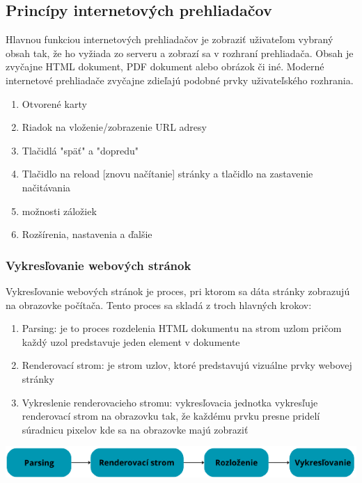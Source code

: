 \documentclass[10pt,Slovak,a4paper]{article}
\begin{document}
    
    \subsection{Princípy internetových prehliadačov}
    \begin{paragraph}
        Hlavnou funkciou internetových prehliadačov je zobraziť uživateľom vybraný obsah tak, že ho vyžiada zo serveru a zobrazí sa v rozhraní prehliadača. Obsah je zvyčajne HTML dokument, PDF dokument alebo obrázok či iné. Moderné internetové prehliadače zvyčajne zdieľajú podobné prvky uživateľského rozhrania. 
        
        \begin{enumerate}
          \item Otvorené karty
          \item Riadok na vloženie/zobrazenie URL adresy
          \item Tlačidlá "späť" a "dopredu"
          \item Tlačidlo na reload [znovu načítanie] stránky a tlačidlo na zastavenie načitávania
          \item možnosti záložiek
          \item Rozšírenia, nastavenia a ďalšie
        \end{enumerate}

        \subsubsection{Vykresľovanie webových stránok}
        Vykresľovanie webových stránok je proces, pri ktorom sa dáta stránky zobrazujú na obrazovke počítača. Tento proces sa skladá z troch hlavných krokov:
        \begin{enumerate}
            \item Parsing: je to proces rozdelenia HTML dokumentu na strom uzlom pričom každý uzol predstavuje jeden element v dokumente
            \item Renderovací strom: je strom uzlov, ktoré predstavujú vizuálne prvky webovej stránky
            \item Vykreslenie renderovacieho stromu: vykresľovacia jednotka vykresľuje renderovací strom na obrazovku tak, že každému prvku presne pridelí súradnicu pixelov kde sa na obrazovke majú zobraziť
        \end{enumerate}
        
        \begin{center}
            \includegraphics[scale=.8]{uvod.png}
            \cite{img1}
        \end{center}
        

\end{paragraph}
\end{document}
